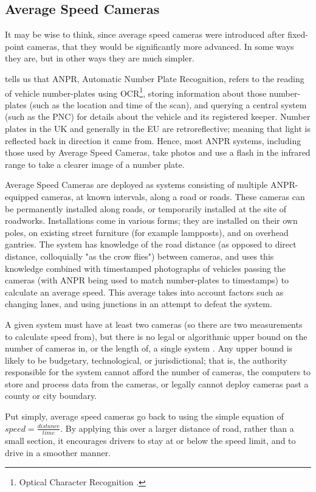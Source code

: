 \documentclass[11pt, a4paper, notitlepage]{report}
\begin{document}
\subsection{Average Speed Cameras}
It may be wise to think, since average speed cameras were introduced after fixed-point cameras, that they would be significantly more advanced. In some ways they are, but in other ways they are much simpler.

\citet{ANPRNPCC} tells us that ANPR, Automatic Number Plate Recognition, refers to the reading of vehicle number-plates using OCR\footnote{Optical Character Recognition \citep{OCR}.}, storing information about those number-plates (such as the location and time of the scan), and querying a central system (such as the PNC) for details about the vehicle and its registered keeper. Number plates in the UK and generally in the EU are retroreflective; meaning that light is reflected back in direction it came from. Hence, most ANPR systems, including those used by Average Speed Cameras, take photos and use a flash in the infrared range to take a clearer image of a number plate.

Average Speed Cameras are deployed as systems consisting of multiple ANPR-equipped cameras, at known intervals, along a road or roads. These cameras can be permanently installed along roads, or temporarily installed at the site of roadworks. Installations come in various forms; they are installed on their own poles, on existing street furniture (for example lampposts), and on overhead gantries. The system has knowledge of the road distance (as opposed to direct distance, colloquially "as the crow flies") between cameras, and uses this knowledge combined with timestamped photographs of vehicles passing the cameras (with ANPR being used to match number-plates to timestamps) to calculate an average speed. This average takes into account factors such as changing lanes, and using junctions in an attempt to defeat the system.

A given system must have at least two cameras (so there are two measurements to calculate speed from), but there is no legal or algorithmic upper bound on the number of cameras in, or the length of, a single system \citep{cbASC}. Any upper bound is likely to be budgetary, technological, or jurisdictional; that is, the authority responsible for the system cannot afford the number of cameras, the computers to store and process data from the cameras, or legally cannot deploy cameras past a county or city boundary.

Put simply, average speed cameras go back to using the simple equation of $ speed = \frac{distance}{time} $. By applying this over a larger distance of road, rather than a small section, it encourages drivers to stay at or below the speed limit, and to drive in a smoother manner.
\end{document}
